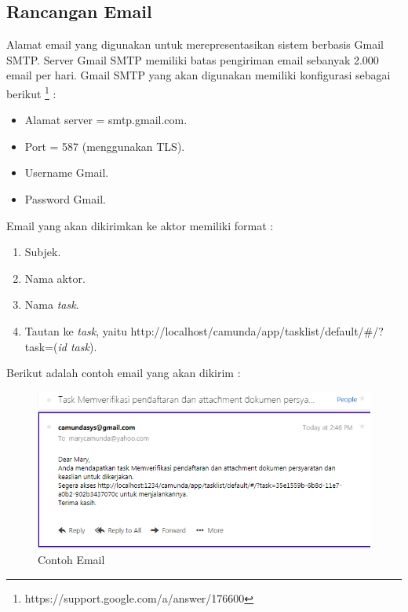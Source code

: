\subsection{Rancangan Email}
\label{Rancangansistem_rancanganemail}
Alamat email yang digunakan untuk merepresentasikan sistem berbasis Gmail SMTP. Server Gmail SMTP memiliki batas pengiriman email sebanyak 2.000 email per hari. Gmail SMTP yang akan digunakan memiliki konfigurasi sebagai berikut \footnote{https://support.google.com/a/answer/176600} :
\begin{itemize}
	\item Alamat server = smtp.gmail.com.
	\item Port = 587 (menggunakan TLS).
	\item Username Gmail.
	\item Password Gmail.
\end{itemize}
Email yang akan dikirimkan ke aktor memiliki format :
\begin{enumerate}
	\item Subjek.
	\item Nama aktor.
	\item Nama \textit{task}.
	\item Tautan ke \textit{task}, yaitu http://localhost/camunda/app/tasklist/default/\#/?task=(\textit{id task}).
\end{enumerate}
Berikut adalah contoh email yang akan dikirim :
			\begin{figure}[H]
			\centering
			\includegraphics[scale=0.8]{Gambar/Bab-5/kasus2/12}
			\caption{Contoh Email} 
			\label{fig:perancangan_contohemail}
	\end{figure}
 

